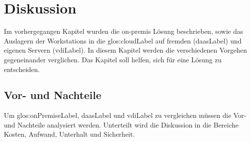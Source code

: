 
\chapter{Diskussion}
Im vorhergegangen Kapitel wurden die on-premis Lösung beschrieben, sowie das Auslagern der Workstations in die \Gls{glos:cloudLabel} auf fremden (\Gls{daasLabel}) und eigenen Servern (\Gls{vdiLabel}). In diesem Kapitel werden die verschiedenen Vorgehen gegeneinander verglichen. Das Kapitel soll helfen, sich für eine Lösung zu entscheiden.


\section{Vor- und Nachteile}




Um \gls{glos:onPremiseLabel}, \Gls{daasLabel} und \Gls{vdiLabel} zu vergleichen müssen die Vor- und Nachteile analysiert werden.
Unterteilt wird die Diskussion in die Bereiche Kosten, Aufwand, Unterhalt und Sicherheit.

